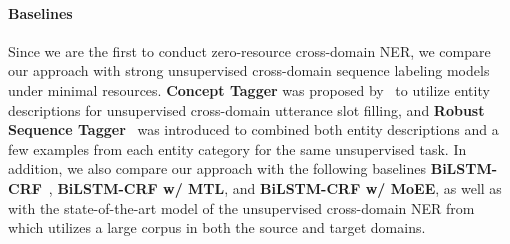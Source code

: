 \documentclass[11pt,a4paper]{article}
\begin{document}
\begin{table}[!t]
\centering
{}
\caption{F1-scores on the target domain. Models are implemented based on the corresponding embeddings.}
\label{tab:results}
\end{table}

\paragraph{Baselines}
Since we are the first to conduct zero-resource cross-domain NER, we compare our approach with strong unsupervised cross-domain sequence labeling models under minimal resources. \textbf{Concept Tagger} was proposed by~\citet{bapna2017towards} to utilize entity descriptions for unsupervised cross-domain utterance slot filling, and \textbf{Robust Sequence Tagger}~\cite{shah2019robust} was introduced to combined both entity descriptions and a few examples from each entity category for the same unsupervised task. In addition, we also compare our approach with the following baselines \textbf{BiLSTM-CRF}~\cite{lample2016neural}, \textbf{BiLSTM-CRF w/ MTL}, and \textbf{BiLSTM-CRF w/ MoEE}, as well as with the state-of-the-art model of the unsupervised cross-domain NER from~\citet{jia2019cross} which utilizes a large corpus in both the source and target domains.
\end{document}
